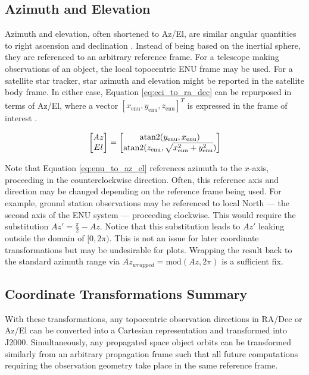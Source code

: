 \subsection{Azimuth and Elevation}

Azimuth and elevation, often shortened to Az/El, are similar angular quantities to right ascension and declination \cite{frueh2019notes}. Instead of being based on
the inertial sphere, they are referenced to an arbitrary reference frame. For a telescope making
observations of an object, the local topocentric ENU frame may be used. For a satellite star
tracker, star azimuth and elevation might be reported in the satellite body frame. In either case,
Equation \ref{eq:eci_to_ra_dec} can be repurposed in terms of Az/El, where a vector $\left[ x_\mathrm{enu}, y_\mathrm{enu}, z_\mathrm{enu} \right]^T$ is expressed in the frame of interest \cite{frueh2019notes}.

\begin{equation} \label{eq:enu_to_az_el}
  \begin{bmatrix}
	Az \\
	El
  \end{bmatrix} = 
  \begin{bmatrix}
	\operatorname{atan2}(y_\mathrm{enu}, x_\mathrm{enu}) \\
	\operatorname{atan2}(z_\mathrm{enu}, \sqrt{x_\mathrm{enu}^2 + y_\mathrm{enu}^2})
  \end{bmatrix}
\end{equation}

Note that Equation \ref{eq:enu_to_az_el} references azimuth to the $x$-axis, proceeding in the
counterclockwise direction. Often, this reference axis and direction may be changed depending on the
reference frame being used. For example, ground station observations may be referenced to local
North ---  the second axis of the ENU system ---  proceeding clockwise. This would require the
substitution $Az' = \frac{\pi}{2} - Az$. Notice that this substitution leads to $Az'$ leaking
outside the domain of $[0, 2\pi)$. This is not an issue for later coordinate transformations but
may be undesirable for plots. Wrapping the result back to the standard azimuth range via
$Az_{wrapped} = \textrm{mod}(Az, 2\pi)$ is a sufficient fix.

\subsection{Coordinate Transformations Summary}

With these transformations, any topocentric observation directions in RA/Dec or Az/El can be converted into a Cartesian representation and transformed into J2000. Simultaneously, any propagated space object orbits can be transformed similarly from an arbitrary propagation frame such that all future computations requiring the observation geometry take place in the same reference frame. 

